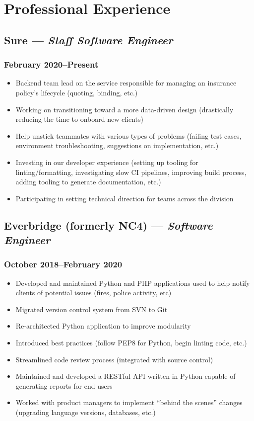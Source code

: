 \documentclass{article}
\begin{document}
\begin{minipage}[t]{.6\textwidth}
	\section*{Professional Experience}
	\subsection*{Sure  --- \textit{Staff Software Engineer}}
	\subsubsection*{February 2020--Present}
	\begin{itemize}
		\item Backend team lead on the service responsible for managing an
		      insurance policy's lifecycle (quoting, binding, etc.)
		\item Working on transitioning toward a more data-driven design
		      (drastically reducing the time to onboard new clients)
		\item Help unstick teammates with various types of problems (failing test cases,
		      environment troubleshooting, suggestions on implementation, etc.)
		\item Investing in our developer experience (setting up tooling for
		      linting/formatting, investigating slow CI pipelines, improving
		      build
		      process, adding tooling to generate documentation, etc.)
		\item Participating in setting technical direction for teams across the
		      division
	\end{itemize}
	\subsection*{Everbridge (formerly NC4) --- \textit{Software Engineer}}
	\subsubsection*{October 2018--February 2020}
	\begin{itemize}
		\item Developed and maintained Python and PHP applications used to help notify
		      clients of potential issues (fires, police activity, etc)
		\item Migrated version control system from SVN to Git
		\item Re-architected Python application to improve modularity
		\item Introduced best practices (follow PEP8 for Python, begin linting code, etc.)
		\item Streamlined code review process (integrated with source control)
		\item Maintained and developed a RESTful API written in Python capable of generating
		      reports for end users
		\item Worked with product managers to implement ``behind the scenes'' changes
		      (upgrading language versions, databases, etc.)
	\end{itemize}

\end{minipage}
\end{document}
